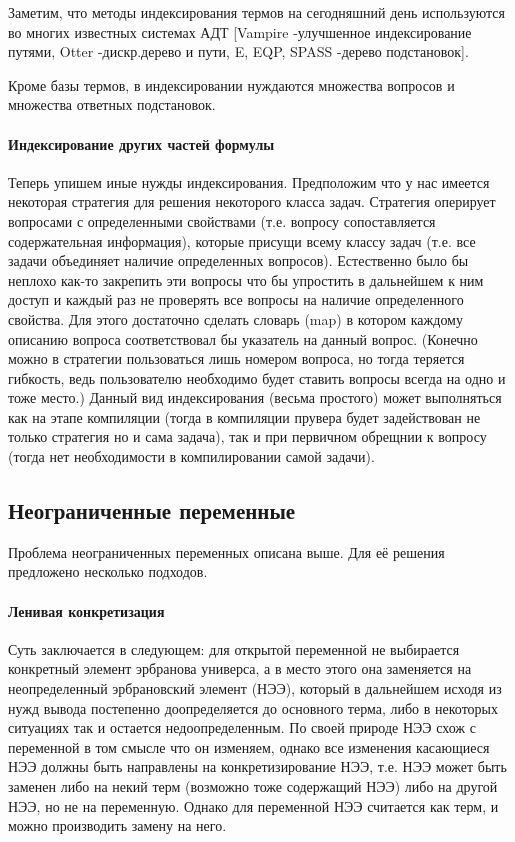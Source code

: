 Заметим, что методы индексирования термов на сегодняшний день используются во многих известных системах АДТ [Vampire -улучшенное индексирование путями, Otter -дискр.дерево и пути, E, EQP, SPASS -дерево подстановок].

Кроме базы термов, в индексировании нуждаются множества вопросов и множества ответных подстановок.

\paragraph{Индексирование других частей формулы}
Теперь упишем иные нужды индексирования. Предположим что у нас имеется некоторая стратегия для решения некоторого класса задач. Стратегия оперирует вопросами с определенными свойствами (т.е. вопросу сопоставляется содержательная информация), которые присущи всему классу задач (т.е. все задачи объединяет наличие определенных вопросов). 
Естественно было бы неплохо как-то закрепить эти вопросы что бы упростить в дальнейшем к ним доступ и каждый раз не проверять все вопросы на наличие определенного свойства. 
Для этого достаточно сделать словарь (map) в котором каждому описанию вопроса соответствовал бы указатель на данный вопрос. (Конечно можно в стратегии пользоваться лишь номером вопроса, но тогда теряется гибкость, ведь пользователю необходимо будет ставить вопросы всегда на одно и тоже место.) 
Данный вид индексирования (весьма простого) может выполняться как на этапе компиляции (тогда в компиляции прувера будет задействован не только стратегия но и сама задача), так и при первичном обрещнии к вопросу (тогда нет необходимости в компилировании самой задачи).


\subsection{Неограниченные переменные}
Проблема неограниченных переменных описана выше. Для её решения предложено несколько подходов.

\paragraph{Ленивая конкретизация}
Суть заключается в следующем: для открытой переменной не выбирается конкретный элемент эрбранова универса, а в место этого она заменяется на неопределенный эрбрановский элемент (НЭЭ), который в дальнейшем исходя из нужд вывода постепенно доопределяется до основного терма, либо в некоторых ситуациях так и остается недоопределенным. 
По своей природе НЭЭ схож с переменной в том смысле что он изменяем, однако все изменения касающиеся НЭЭ должны быть направлены на конкретизирование НЭЭ, т.е. НЭЭ может быть заменен либо на некий терм (возможно тоже содержащий НЭЭ) либо на другой НЭЭ, но не на переменную. Однако для переменной НЭЭ считается как терм, и можно производить замену на него.

